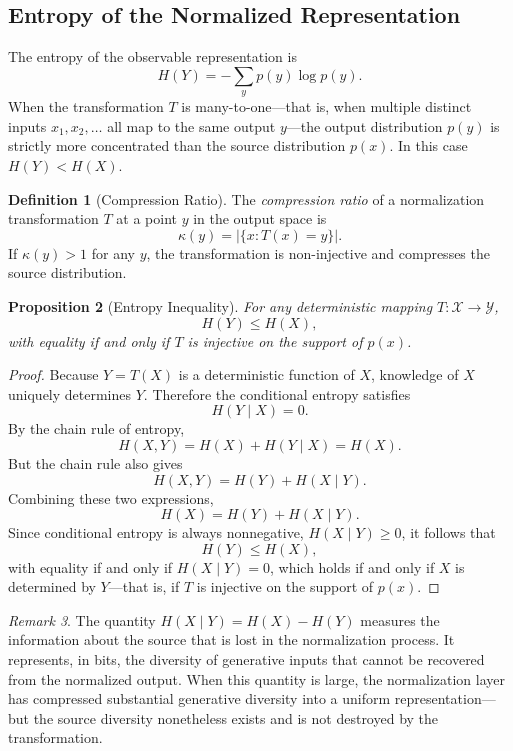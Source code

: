 \documentclass[12pt,a4paper]{article}
\theoremstyle{definition}
\newtheorem{definition}{Definition}[section]
\theoremstyle{plain}
\newtheorem{proposition}[definition]{Proposition}
\theoremstyle{remark}
\newtheorem{remark}[definition]{Remark}
\begin{document}
\subsection{Entropy of the Normalized Representation}

The entropy of the observable representation is
\[
H(Y) = -\sum_y p(y)\log p(y).
\]
When the transformation $T$ is many-to-one---that is, when multiple distinct inputs $x_1, x_2,
\ldots$ all map to the same output $y$---the output distribution $p(y)$ is strictly more
concentrated than the source distribution $p(x)$. In this case $H(Y) < H(X)$.

\begin{definition}[Compression Ratio]
The \emph{compression ratio} of a normalization transformation $T$ at a point $y$ in the
output space is
\[
\kappa(y) = |\{x : T(x) = y\}|.
\]
If $\kappa(y) > 1$ for any $y$, the transformation is non-injective and compresses the
source distribution.
\end{definition}

\begin{proposition}[Entropy Inequality]
\label{prop:entropy}
For any deterministic mapping $T : \mathcal{X} \to \mathcal{Y}$,
\[
H(Y) \leq H(X),
\]
with equality if and only if $T$ is injective on the support of $p(x)$.
\end{proposition}

\begin{proof}
Because $Y = T(X)$ is a deterministic function of $X$, knowledge of $X$ uniquely determines
$Y$. Therefore the conditional entropy satisfies
\[
H(Y \mid X) = 0.
\]
By the chain rule of entropy,
\[
H(X, Y) = H(X) + H(Y \mid X) = H(X).
\]
But the chain rule also gives
\[
H(X, Y) = H(Y) + H(X \mid Y).
\]
Combining these two expressions,
\[
H(X) = H(Y) + H(X \mid Y).
\]
Since conditional entropy is always nonnegative, $H(X \mid Y) \geq 0$, it follows that
\[
H(Y) \leq H(X),
\]
with equality if and only if $H(X \mid Y) = 0$, which holds if and only if $X$ is determined
by $Y$---that is, if $T$ is injective on the support of $p(x)$.
\end{proof}

\begin{remark}
The quantity $H(X \mid Y) = H(X) - H(Y)$ measures the information about the source that is
lost in the normalization process. It represents, in bits, the diversity of generative inputs
that cannot be recovered from the normalized output. When this quantity is large, the
normalization layer has compressed substantial generative diversity into a uniform
representation---but the source diversity nonetheless exists and is not destroyed by the
transformation.
\end{remark}
\end{document}
